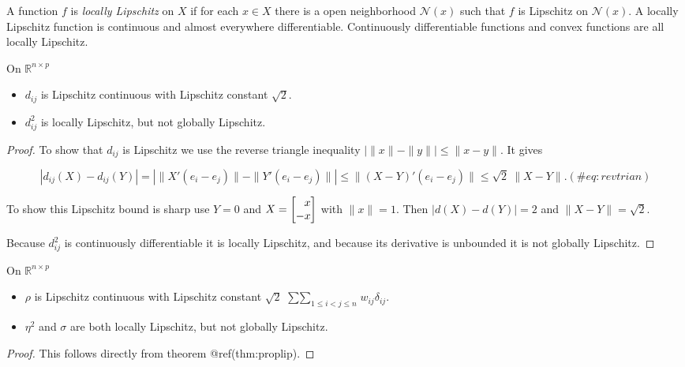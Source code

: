 \documentclass[
  12pt,
  letterpaper,
  DIV=11,
  numbers=noendperiod]{scrreprt}
\providecommand{\tightlist}{%
  \setlength{\itemsep}{0pt}\setlength{\parskip}{0pt}}\usepackage{longtable,booktabs,array}
\theoremstyle{remark}
\begin{document}
A function \(f\) is \emph{locally Lipschitz} on \(X\) if for each
\(x\in X\) there is a open neighborhood \(\mathcal{N}(x)\) such that
\(f\) is Lipschitz on \(\mathcal{N}(x)\). A locally Lipschitz function
is continuous and almost everywhere differentiable. Continuously
differentiable functions and convex functions are all locally Lipschitz.

\label{proplip}
On \(\mathbb{R}^{n\times p}\)

\begin{itemize}
\tightlist
\item
  \(d_{ij}\) is Lipschitz continuous with Lipschitz constant
  \(\sqrt{2}\).
\item
  \(d_{ij}^2\) is locally Lipschitz, but not globally Lipschitz.
\end{itemize}

\begin{proof}
To show that \(d_{ij}\) is Lipschitz we use the reverse triangle
inequality \(|\|x\|-\|y\||\leq\|x - y\|\). It gives

\begin{equation}
|d_{ij}(X)-d_{ij}(Y)|=
|\|X'(e_i-e_j)\|-\|Y'(e_i-e_j)\||
\leq\|(X-Y)'(e_i-e_j)\|\leq\sqrt{2}\ \|X-Y\|.
(\#eq:revtrian)
\end{equation}

To show this Lipschitz bound is sharp use \(Y=0\) and
\(X=\begin{bmatrix}\hfill x\\-x\end{bmatrix}\) with \(\|x\|=1\). Then
\(|d(X)-d(Y)|=2\) and \(\|X-Y\|=\sqrt{2}\).

Because \(d_{ij}^2\) is continuously differentiable it is locally
Lipschitz, and because its derivative is unbounded it is not globally
Lipschitz.
\end{proof}

\label{proplosscont}
On \(\mathbb{R}^{n\times p}\)

\begin{itemize}
\tightlist
\item
  \(\rho\) is Lipschitz continuous with Lipschitz constant
  \(\sqrt{2}\ \mathop{\sum\sum}_{1\leq i<j\leq n}w_{ij}\delta_{ij}\).
\item
  \(\eta^2\) and \(\sigma\) are both locally Lipschitz, but not globally
  Lipschitz.
\end{itemize}

\begin{proof}
This follows directly from theorem @ref(thm:proplip).
\end{proof}
\end{document}
